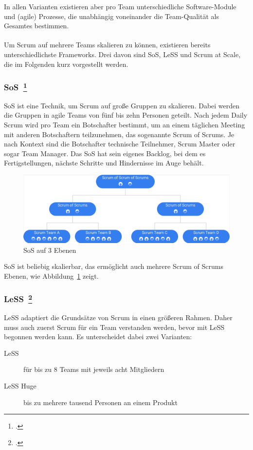 In allen Varianten existieren aber pro Team unterschiedliche Software-Module und (agile) Prozesse, die unabhängig voneinander die Team-Qualität als Gesamtes bestimmen.
\\
\\
Um Scrum auf mehrere Teams skalieren zu können, existieren bereits unterschiedlichste Frameworks.
Drei davon sind \ac{SoS}, \ac{LeSS} und Scrum at Scale, die im Folgenden kurz vorgestellt werden.

\newpage
\subsubsection[\ac{SoS}]{\ac{SoS}~\footcite[vgl.][]{sos}}

\ac{SoS} ist eine Technik, um Scrum auf große Gruppen zu skalieren. 
Dabei werden die Gruppen in agile Teams von fünf bis zehn Personen geteilt.
Nach jedem Daily Scrum wird pro Team ein Botschafter bestimmt, um an einem täglichen Meeting mit anderen Botschaftern teilzunehmen, das sogenannte Scrum of Scrums.
Je nach Kontext sind die Botschafter technische Teilnehmer, Scrum Master oder sogar Team Manager.
Das \ac{SoS} hat sein eigenes Backlog, bei dem es Fertigstellungen, nächste Schritte und Hindernisse im Auge behält.

\begin{savenotes}
  \begin{figure}[H] 
    \centering
       \includegraphics[width=1.0\textwidth]{img/sos.png}
    \caption{\ac{SoS} auf 3 Ebenen}\label{fig:sos}
  \end{figure}
\end{savenotes}

\ac{SoS} ist beliebig skalierbar, das ermöglicht auch mehrere Scrum of Scrums Ebenen, wie Abbildung~\ref{fig:sos} zeigt.

\subsubsection[\ac{LeSS}]{\ac{LeSS}~\footcite[vgl.][]{less}}

\ac{LeSS} adaptiert die Grundsätze von Scrum in einen größeren Rahmen.
Daher muss auch zuerst Scrum für ein Team verstanden werden, bevor mit \ac{LeSS} begonnen werden kann.
Es unterscheidet dabei zwei Varianten:
\begin{description}
  \item[LeSS] für bis zu 8 Teams mit jeweils acht Mitgliedern
  \item[LeSS Huge] bis zu mehrere tausend Personen an einem Produkt
\end{description}

